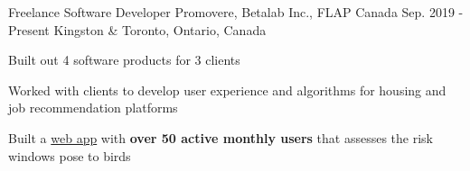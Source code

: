 \begin{cventries}
  \cventry
    {Freelance Software Developer} %
    {Promovere, Betalab Inc., FLAP Canada} %
    {Sep. 2019 - Present} %
    {Kingston \& Toronto, Ontario, Canada} %
    {
      \begin{cvitems} %
        \item{Built out 4 software products for 3 clients}
        \item{Worked with clients to develop user experience and algorithms for housing and job recommendation platforms}
        \item {Built a \href{https://www.flapapp.ca/}{web app} with \textbf{over 50 active monthly users} that assesses the risk windows pose to birds}
      \end{cvitems}
    }


\end{cventries}
